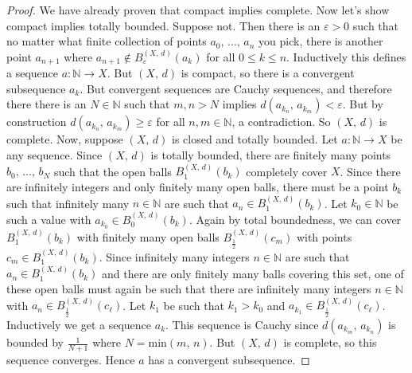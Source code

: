 \documentclass{article}
\theoremstyle{plain}
\theoremstyle{normal}
\begin{document}
        \begin{proof}
            We have already proven that compact implies complete. Now let's
            show compact implies totally bounded. Suppose not. Then there is
            an $\varepsilon>0$ such that no matter what finite collection of
            points $a_{0},\,\dots,\,a_{n}$ you pick, there is another point
            $a_{n+1}$ where $a_{n+1}\notin{B}_{\varepsilon}^{(X,\,d)}(a_{k})$
            for all $0\leq{k}\leq{n}$. Inductively this defines a sequence
            $a:\mathbb{N}\rightarrow{X}$. But $(X,\,d)$ is compact, so there
            is a convergent subsequence $a_{k}$. But convergent sequences are
            Cauchy sequences, and therefore there there is an
            $N\in\mathbb{N}$ such that $m,n>N$ implies
            $d(a_{k_{n}},\,a_{k_{m}})<\varepsilon$. But by construction
            $d(a_{k_{n}},\,a_{k_{m}})\geq\varepsilon$ for all
            $n,m\in\mathbb{N}$, a contradiction. So $(X,\,d)$ is complete.
            Now, suppose $(X,\,d)$ is closed and totally bounded. Let
            $a:\mathbb{N}\rightarrow{X}$ be any sequence. Since
            $(X,\,d)$ is totally bounded, there are finitely many points
            $b_{0},\,\dots,\,b_{N}$ such that the open balls
            $B_{1}^{(X,\,d)}(b_{k})$ completely cover $X$. Since there are
            infinitely integers and only finitely many open balls, there
            must be a point $b_{k}$ such that infinitely many $n\in\mathbb{N}$
            are such that $a_{n}\in{B}_{1}^{(X,\,d)}(b_{k})$. Let
            $k_{0}\in\mathbb{N}$ be such a value
            with $a_{k_{0}}\in{B}_{0}^{(X,\,d)}(b_{k})$. Again by total
            boundedness, we can cover $B_{1}^{(X,\,d)}(b_{k})$ with finitely
            many open balls $B_{\frac{1}{2}}^{(X,\,d)}(c_{m})$ with points
            $c_{m}\in{B}_{1}^{(X,\,d)}(b_{k})$. Since infinitely many integers
            $n\in\mathbb{N}$ are such that $a_{n}\in{B}_{1}^{(X,\,d)}(b_{k})$
            and there are only finitely many balls covering this set,
            one of these open balls must again be such that there are
            infinitely many integers $n\in\mathbb{N}$ with
            $a_{n}\in{B}_{\frac{1}{2}}^{(X,\,d)}(c_{\ell})$. Let
            $k_{1}$ be such that $k_{1}>k_{0}$ and
            $a_{k_{1}}\in{B}_{\frac{1}{2}}^{(X,\,d)}(c_{\ell})$. Inductively
            we get a sequence $a_{k}$. This sequence is Cauchy since
            $d(a_{k_{m}},\,a_{k_{n}})$ is bounded by $\frac{1}{N+1}$ where
            $N=\textrm{min}(m,\,n)$. But $(X,\,d)$ is complete, so this sequence
            converges. Hence $a$ has a convergent subsequence.
        \end{proof}
\end{document}
